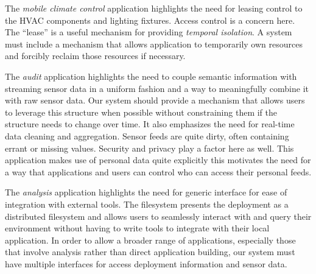 The \emph{mobile climate control} application highlights the need for leasing control to the HVAC components and lighting fixtures.  Access control is a concern here.  The ``lease'' is a useful mechanism for providing \emph{temporal isolation}.  A system must include a mechanism that allows application to temporarily own resources and forcibly reclaim those resources if necessary.

The \emph{audit} application highlights the need to couple semantic information with streaming sensor data in a uniform fashion and a way to meaningfully combine it with raw sensor data.  Our system should provide a mechanism that allows users to leverage this structure when possible without constraining them if the structure needs to change over time.  It also emphasizes the need for real-time data cleaning and aggregation.  Sensor feeds are quite dirty, often containing errant or missing values.  Security and privacy play a factor here as well.  This application makes use of personal data quite explicitly this motivates the need for a way that applications and users can control who can access their personal feeds.

The \emph{analysis} application highlights the need for generic interface for ease of integration with external tools.  The filesystem presents the deployment as a distributed filesystem and allows users to seamlessly interact with and query their environment without having to write tools to integrate with their local application.  In order to allow a broader range of applications, especially those that involve analysis rather than direct application building, our system must have multiple interfaces for access deployment information and sensor data.

%

